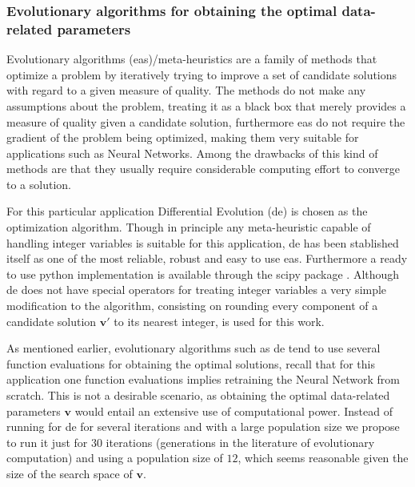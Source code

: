 \subsubsection{Evolutionary algorithms for obtaining the optimal data-related parameters}
\label{sec:ea_optimization_process}

Evolutionary algorithms (\glspl{ea})/meta-heuristics are a family of methods that optimize a problem by iteratively trying to improve a set of candidate solutions with regard to a given measure of quality. The methods do not make any assumptions about the problem, treating it as a black box that merely provides a measure of quality given a candidate solution, furthermore \glspl{ea} do not require the gradient of the problem being optimized, making them very suitable for applications such as Neural Networks. Among the drawbacks of this kind of methods are that they usually require considerable computing effort to converge to a solution.

For this particular application Differential Evolution (\gls{de}) \cite{Storn1997} is chosen as the optimization algorithm. Though in principle any meta-heuristic capable of handling integer variables is suitable for this application, \gls{de} has been stablished itself as one of the most reliable, robust and easy to use \glspl{ea}. Furthermore a ready to use python implementation is available through the scipy package \cite{scipy}. Although \gls{de} does not have special operators for treating integer variables a very simple modification to the algorithm, consisting on rounding every component of a candidate solution $\mathbf{v}'$ to its nearest integer, is used for this work.

As mentioned earlier, evolutionary algorithms such as \gls{de} tend to use several function evaluations for obtaining the optimal solutions, recall that for this application one function evaluations implies retraining the Neural Network from scratch. This is not a desirable scenario, as obtaining the optimal data-related parameters $\mathbf{v}$ would entail an extensive use of computational power. Instead of running for \gls{de} for several iterations and with a large population size we propose to run it just for $30$ iterations (generations in the literature of evolutionary computation) and using a population size of $12$, which seems reasonable given the size of the search space of $\mathbf{v}$. 

